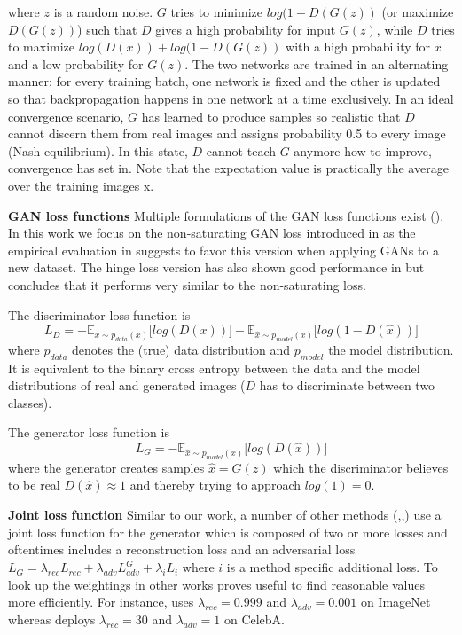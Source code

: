 \documentclass[12pt,a4paper]{article}
\begin{document}
where $z$ is a random noise. $G$ tries to minimize $log(1 - D(G(z))$ (or maximize $D(G(z))$) such that $D$ gives a high probability for input $G(z)$, while $D$ tries to maximize $log(D(x)) + log(1 - D(G(z))$ with a high probability for $x$ and a low probability for $G(z)$. The two networks are trained in an alternating manner: for every training batch, one network is fixed and the other is updated so that backpropagation happens in one network at a time exclusively. In an ideal convergence scenario, $G$ has learned to produce samples so realistic that $D$ cannot discern them from real images and assigns probability 0.5 to every image (Nash equilibrium). In this state, $D$ cannot teach $G$ anymore how to improve, convergence has set in. Note that the expectation value is practically the average over the training images x.

\par \textbf{GAN loss functions} 
Multiple formulations of the GAN loss functions exist (\cite{1807.04720}). In this work we focus on the non-saturating GAN loss introduced in \cite{1406.2661} as the empirical evaluation in \cite{1807.04720} suggests to favor this version when applying GANs to a new dataset. The hinge loss version has also shown good performance in \cite{1802.05957} but \cite{1807.04720} concludes that it performs very similar to the non-saturating loss.

The discriminator loss function is
\begin{equation} \label{eq:d_loss}
    L_{D} = -\mathbb{E}_{x\sim p_{data} (x)}\big[log(D(x))\big] - \mathbb{E}_{\hat{x}\sim p_{model} (x)}\big[log(1 - D(\hat{x}))\big]
\end{equation}
where $p_{data}$ denotes the (true) data distribution and $p_{model}$ the model distribution. It is equivalent to the binary cross entropy between the data and the model distributions of real and generated images ($D$ has to discriminate between two classes).

The generator loss function is
\begin{equation} \label{eq:g_loss}
    L_{G} = -\mathbb{E}_{\hat{x}\sim p_{model} (x)}\big[log(D(\hat{x}))\big]
\end{equation}
where the generator creates samples $\hat{x} = G(z)$ which the discriminator believes to be real $D(\hat{x}) \approx 1$ and thereby trying to approach $log(1) = 0$.

\par \textbf{Joint loss function}
Similar to our work, a number of other methods (\cite{1511.05440},\cite{1711.07410},\cite{1604.07379}) use a joint loss function for the generator which is composed of two or more losses and oftentimes includes a reconstruction loss and an adversarial loss $L_G = \lambda_{rec}L_{rec} + \lambda_{adv}L^G_{adv} + \lambda_{i}L_{i}$ where $i$ is a method specific additional loss. To look up the weightings in other works proves useful to find reasonable values more efficiently. For instance, \cite{1604.07379} uses $\lambda_{rec} = 0.999$ and $\lambda_{adv} = 0.001$ on ImageNet whereas \cite{1711.07410} deploys $\lambda_{rec} = 30$ and $\lambda_{adv} = 1$ on CelebA.
\end{document}
